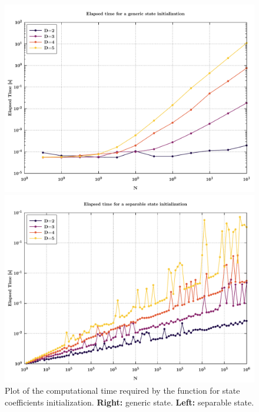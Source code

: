 \documentclass[rmp,10pt,onecolumn,fleqn,notitlepage]{revtex4-1}
\begin{document}
\begin{figure}[h!]
\begin{minipage}[c]{0.49\linewidth}
\centering
\includegraphics[width=1\textwidth]{image/time_non-sep.pdf}
\end{minipage}
\begin{minipage}[]{0.49\linewidth}
\centering
\includegraphics[width=1\textwidth]{image/time_sep.pdf}
\end{minipage}
\caption{\label{fig:init_result} Plot of the computational time required by the function for state coefficients initialization. \textbf{Right:} generic state. \textbf{Left:} separable state.}
\end{figure}
\end{document}
